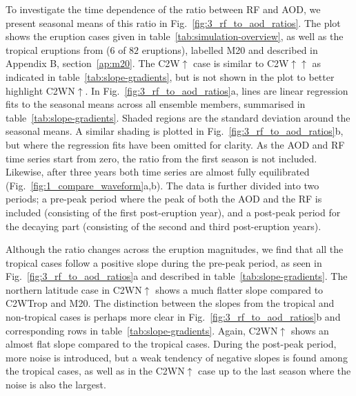 \documentclass[draft]{agujournal2019}
\begin{document}
To investigate the time dependence of the ratio between RF and AOD, we present seasonal
means of this ratio in Fig.~\ref{fig:3_rf_to_aod_ratios}. The plot shows the eruption
cases given in table~\ref{tab:simulation-overview}, as well as the tropical eruptions
from  (\(6\) of \(82\) eruptions), labelled M20 and described
in Appendix B, section~\ref{ap:m20}. The C2W\(\uparrow\) case is similar to
C2W\(\uparrow\uparrow\) as indicated in table~\ref{tab:slope-gradients}, but is not
shown in the plot to better highlight C2WN\(\uparrow\). In
Fig.~\ref{fig:3_rf_to_aod_ratios}a, lines are linear regression fits to the seasonal
means across all ensemble members, summarised in table~\ref{tab:slope-gradients}. Shaded
regions are the standard deviation around the seasonal means. A similar shading is
plotted in Fig.~\ref{fig:3_rf_to_aod_ratios}b, but where the regression fits have been
omitted for clarity. As the AOD and RF time series start from zero, the ratio from the
first season is not included. Likewise, after three years both time series are almost
fully equilibrated (Fig.~\ref{fig:1_compare_waveform}a,b). The data is further divided
into two periods; a pre-peak period where the peak of both the AOD and the RF is
included (consisting of the first post-eruption year), and a post-peak period for the
decaying part (consisting of the second and third post-eruption years).

Although the ratio changes across the eruption magnitudes, we find that all the tropical
cases follow a positive slope during the pre-peak period, as seen in
Fig.~\ref{fig:3_rf_to_aod_ratios}a and described in table~\ref{tab:slope-gradients}. The
northern latitude case in C2WN\(\uparrow\) shows a much flatter slope compared to
C2WTrop and M20. The distinction between the slopes from the tropical and non-tropical
cases is perhaps more clear in Fig.~\ref{fig:3_rf_to_aod_ratios}b and corresponding rows
in table~\ref{tab:slope-gradients}. Again, C2WN\(\uparrow\) shows an almost flat slope
compared to the tropical cases. During the post-peak period, more noise is introduced,
but a weak tendency of negative slopes is found among the tropical cases, as well as in
the C2WN\(\uparrow\) case up to the last season where the noise is also the largest.
\end{document}
